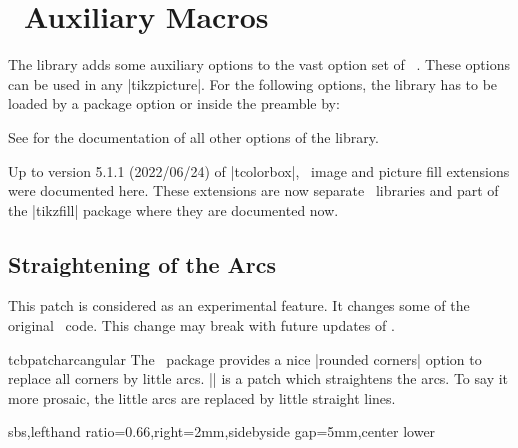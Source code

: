 \clearpage
\section{\tikzname\ Auxiliary Macros}\label{sec:tikzimagefilling}%
%
The  library adds some auxiliary options to the vast option set of
\tikzname\ \cite{tantau:tikz_and_pgf}. These options can be used in any |tikzpicture|.
For the following options, the  library has to be loaded
by a package option or inside the preamble by:
\begin{dispListing}
\end{dispListing}

See  for the documentation of all other options of the  library.

\begin{marker}
Up to version 5.1.1 (2022/06/24) of |tcolorbox|, \tikzname\ image and picture fill extensions
were documented here. These extensions are now separate \tikzname\ libraries
and part of the |tikzfill| package where they are documented now.
\end{marker}


\subsection{Straightening of the Arcs}

\begin{marker}
This patch is considered as an experimental feature.
It changes some of the original \tikzname\ code. This change may break
with future updates of \tikzname.
\end{marker}

\begin{docCommand}[doc new=2014-05-05]{tcbpatcharcangular}{}
The \tikzname\ package provides a nice |rounded corners| option to replace
all corners by little arcs. |\tcbpatcharcangular| is a patch which
straightens the arcs. To say it more prosaic, the little arcs are replaced
by little straight lines.

\begin{dispExample*}{sbs,lefthand ratio=0.66,right=2mm,sidebyside gap=5mm,center lower}
\end{dispExample*}

\end{docCommand}


